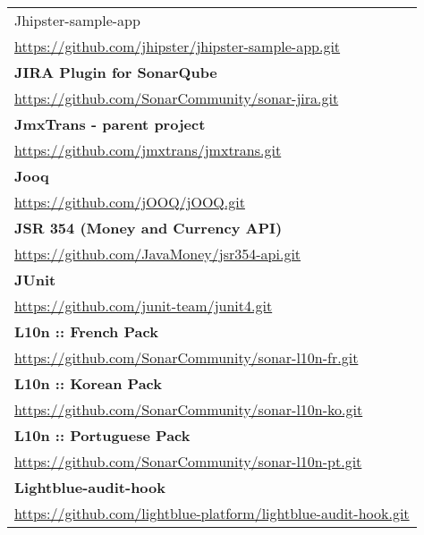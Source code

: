 \begin{table}[]
\begin{tabular}{|p{130mm}|}
Jhipster-sample-app                                \\ \url{https://github.com/jhipster/jhipster-sample-app.git}                          \\ \hline \bf
JIRA Plugin for SonarQube                          \\ \url{https://github.com/SonarCommunity/sonar-jira.git}                             \\ \hline \bf
JmxTrans - parent project                          \\ \url{https://github.com/jmxtrans/jmxtrans.git}                                     \\ \hline \bf
Jooq                                               \\ \url{https://github.com/jOOQ/jOOQ.git}                                             \\ \hline \bf
JSR 354 (Money and Currency API)                   \\ \url{https://github.com/JavaMoney/jsr354-api.git}                                  \\ \hline \bf
JUnit                                              \\ \url{https://github.com/junit-team/junit4.git}                                     \\ \hline \bf
L10n :: French Pack                                \\ \url{https://github.com/SonarCommunity/sonar-l10n-fr.git}                          \\ \hline \bf
L10n :: Korean Pack                                \\ \url{https://github.com/SonarCommunity/sonar-l10n-ko.git}                          \\ \hline \bf
L10n :: Portuguese Pack                            \\ \url{https://github.com/SonarCommunity/sonar-l10n-pt.git}                          \\ \hline \bf 
Lightblue-audit-hook                               \\ \url{https://github.com/lightblue-platform/lightblue-audit-hook.git}               \\ \hline

\end{tabular}
\end{table}


